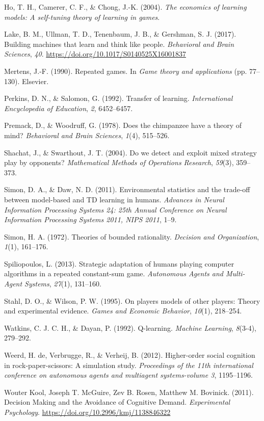\documentclass[man,floatsintext]{apa6}
\begin{document}
\leavevmode\hypertarget{ref-ho2004economics}{}%
Ho, T. H., Camerer, C. F., \& Chong, J.-K. (2004). \emph{The economics of learning models: A self-tuning theory of learning in games}.

\leavevmode\hypertarget{ref-Lake2017}{}%
Lake, B. M., Ullman, T. D., Tenenbaum, J. B., \& Gershman, S. J. (2017). Building machines that learn and think like people. \emph{Behavioral and Brain Sciences}, \emph{40}. \url{https://doi.org/10.1017/S0140525X16001837}

\leavevmode\hypertarget{ref-mertens1990repeated}{}%
Mertens, J.-F. (1990). Repeated games. In \emph{Game theory and applications} (pp. 77--130). Elsevier.

\leavevmode\hypertarget{ref-perkins1992transfer}{}%
Perkins, D. N., \& Salomon, G. (1992). Transfer of learning. \emph{International Encyclopedia of Education}, \emph{2}, 6452--6457.

\leavevmode\hypertarget{ref-premack1978does}{}%
Premack, D., \& Woodruff, G. (1978). Does the chimpanzee have a theory of mind? \emph{Behavioral and Brain Sciences}, \emph{1}(4), 515--526.

\leavevmode\hypertarget{ref-shachat2004we}{}%
Shachat, J., \& Swarthout, J. T. (2004). Do we detect and exploit mixed strategy play by opponents? \emph{Mathematical Methods of Operations Research}, \emph{59}(3), 359--373.

\leavevmode\hypertarget{ref-Simon_Daw_11}{}%
Simon, D. A., \& Daw, N. D. (2011). Environmental statistics and the trade-off between model-based and TD learning in humans. \emph{Advances in Neural Information Processing Systems 24: 25th Annual Conference on Neural Information Processing Systems 2011, NIPS 2011}, 1--9.

\leavevmode\hypertarget{ref-simon1972theories}{}%
Simon, H. A. (1972). Theories of bounded rationality. \emph{Decision and Organization}, \emph{1}(1), 161--176.

\leavevmode\hypertarget{ref-spiliopoulos2013strategic}{}%
Spiliopoulos, L. (2013). Strategic adaptation of humans playing computer algorithms in a repeated constant-sum game. \emph{Autonomous Agents and Multi-Agent Systems}, \emph{27}(1), 131--160.

\leavevmode\hypertarget{ref-stahl1995players}{}%
Stahl, D. O., \& Wilson, P. W. (1995). On players models of other players: Theory and experimental evidence. \emph{Games and Economic Behavior}, \emph{10}(1), 218--254.

\leavevmode\hypertarget{ref-watkins1992q}{}%
Watkins, C. J. C. H., \& Dayan, P. (1992). Q-learning. \emph{Machine Learning}, \emph{8}(3-4), 279--292.

\leavevmode\hypertarget{ref-de2012higher}{}%
Weerd, H. de, Verbrugge, R., \& Verheij, B. (2012). Higher-order social cognition in rock-paper-scissors: A simulation study. \emph{Proceedings of the 11th international conference on autonomous agents and multiagent systems-volume 3}, 1195--1196.

\leavevmode\hypertarget{ref-Kool_2011}{}%
Wouter Kool, Joseph T. McGuire, Zev B. Rosen, Matthew M. Bovinick. (2011). Decision Making and the Avoidance of Cognitive Demand. \emph{Experimental Psychology}. \url{https://doi.org/10.2996/kmj/1138846322}

\endgroup
\end{document}

